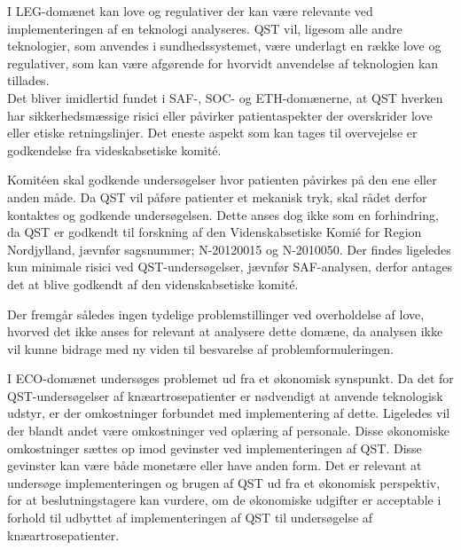 I LEG-domænet kan love og regulativer der kan være relevante ved implementeringen af en teknologi analyseres. QST vil, ligesom alle andre teknologier, som anvendes i sundhedssystemet, være underlagt en række love og regulativer, som kan være afgørende for hvorvidt anvendelse af teknologien kan tillades.\\ 
Det bliver imidlertid fundet i SAF-, SOC- og ETH-domænerne, at QST hverken har sikkerhedsmæssige risici eller påvirker patientaspekter der overskrider love eller etiske retningslinjer. Det eneste aspekt som kan tages til overvejelse er godkendelse fra videskabsetiske komité. 

Komitéen skal godkende undersøgelser hvor patienten påvirkes på den ene eller anden måde. Da QST vil påføre patienter et mekanisk tryk, skal rådet derfor kontaktes og godkende undersøgelsen.\citep{EtiskLov} Dette anses dog ikke som en forhindring, da QST er godkendt til forskning af den Videnskabsetiske Komié for Region Nordjylland, jævnfør sagsnummer; N-20120015 og N-2010050. Der findes ligeledes kun  minimale risici ved QST-undersøgelser, jævnfør SAF-analysen, derfor antages det at blive godkendt af den videnskabsetiske komité.

Der fremgår således ingen tydelige problemstillinger ved overholdelse af love, hvorved det ikke anses for relevant at analysere dette domæne, da analysen ikke vil kunne bidrage med ny viden til besvarelse af problemformuleringen.

I ECO-domænet undersøges problemet ud fra et økonomisk synspunkt. Da det for QST-undersøgelser af knæartrosepatienter er nødvendigt at anvende teknologisk udstyr, er der omkostninger forbundet med implementering af dette. Ligeledes vil der blandt andet være omkostninger ved oplæring af personale. Disse økonomiske omkostninger sættes op imod gevinster ved implementeringen af QST. Disse gevinster kan være både monetære eller have anden form. Det er relevant at undersøge implementeringen og brugen af QST ud fra et økonomisk perspektiv, for at beslutningstagere kan vurdere, om de økonomiske udgifter er acceptable i forhold til udbyttet af implementeringen af QST til undersøgelse af knæartrosepatienter. 

